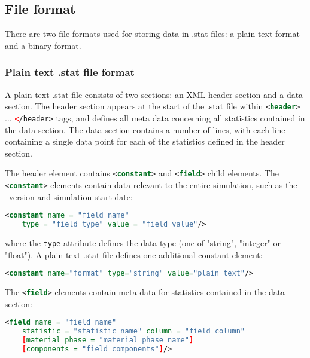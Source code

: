 \subsection{File format}

There are two file formats used for storing data in .stat files: a plain text format
and a binary format.

\subsubsection{Plain text .stat file format}

A plain text .stat file consists of two sections: an XML header section and a
data section. The header section appears at the start of the .stat file within
\lstinline[language = XML]*<header>* $\ldots$
\lstinline[language = XML]*</header>* tags, and defines all meta data concerning
all statistics contained in the data section. The data section contains a number of lines,
with each line containing a single data point for each of the statistics defined in the header
section.

The header element contains
\lstinline[language = XML]*<constant>* and
\lstinline[language = XML]*<field>* child elements. The
\lstinline[language = XML]*<constant>* elements contain data relevant to the
entire simulation, such as the \fluidity\ version and simulation start date:

\begin{lstlisting}[language = XML]
  <constant name = "field_name"
    type = "field_type" value = "field_value"/>
\end{lstlisting}

where the \lstinline[language = XML]*type* attribute defines the data type
(one of "string", "integer" or "float"). A plain text .stat file defines one
additional constant element:

\begin{lstlisting}[language = XML]
<constant name="format" type="string" value="plain_text"/>
\end{lstlisting}

The \lstinline[language = XML]*<field>* elements contain meta-data for statistics
contained in the data section:

\begin{lstlisting}[language = XML]
  <field name = "field_name"
    statistic = "statistic_name" column = "field_column"
    [material_phase = "material_phase_name"]
    [components = "field_components"]/>
\end{lstlisting}

